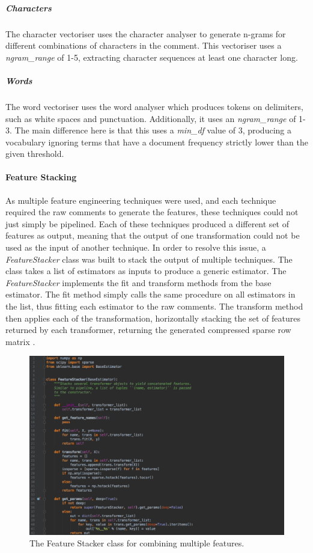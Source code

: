 \subparagraph{Characters} The character vectoriser uses the character analyser to generate n-grams for different combinations of characters in the comment. This vectoriser uses a \textit{ngram\_range} of 1-5, extracting character sequences at least one character long.

\subparagraph{Words} The word vectoriser uses the word analyser which produces tokens on delimiters, such as white spaces and punctuation. Additionally, it uses an \textit{ngram\_range} of 1-3. The main difference here is that this uses a \textit{min\_df} value of 3, producing a vocabulary ignoring terms that have a document frequency strictly lower than the given threshold.

\paragraph{Feature Stacking}
As multiple feature engineering techniques were used, and each technique required the raw comments to generate the features, these techniques could not just simply be pipelined. Each of these techniques produced a different set of features as output, meaning that the output of one transformation could not be used as the input of another technique. In order to resolve this issue, a \textit{FeatureStacker} class was built to stack the output of multiple techniques. The class takes a list of estimators as inputs to produce a generic estimator. The \textit{FeatureStacker} implements the fit and transform methods from the base estimator. The fit method simply calls the same procedure on all estimators in the list, thus fitting each estimator to the raw comments. The transform method then applies each of the transformation, horizontally stacking the set of features returned by each transformer, returning the generated compressed sparse row matrix \cite{Scipy:ToCSR}.

\begin{figure}[H]
    \centering
    \includegraphics[width=\textwidth]{Images/Implementation/DataProcessing/AbuseDetection/FeatureStacker}
    \caption{The Feature Stacker class for combining multiple features.}
    \label{fig:AbuseDetection-FeatureStacker}
\end{figure}

